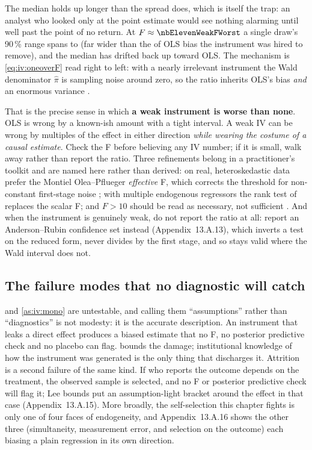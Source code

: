 The median holds up longer than the spread does, which is itself the trap: an analyst who looked
only at the point estimate would see nothing alarming until well past the point of no return. At
$F \approx \nbElevenWeakFWorst$ a single draw's 90\,\% range spans \eur{\nbElevenWeakLo} to
\eur{\nbElevenWeakHi} (far wider than the \eur{\nbElevenNaiveErr} of OLS bias the instrument was
hired to remove), and the median has drifted back up toward OLS. The mechanism is
\cref{eq:iv:oneoverF} read right to left: with a nearly irrelevant instrument the Wald denominator
$\hat\pi$ is sampling noise around zero, so the ratio inherits OLS's bias \emph{and} an enormous
variance \citep{bound1995, staiger1997}.

That is the precise sense in which \textbf{a weak instrument is worse than none}. OLS is wrong by a
known-ish amount with a tight interval. A weak IV can be wrong by multiples of the effect in either
direction \emph{while wearing the costume of a causal estimate}. Check the F before believing any IV
number; if it is small, walk away rather than report the ratio. Three refinements belong in a
practitioner's toolkit and are named here rather than derived: on real, heteroskedastic data prefer
the Montiel Olea--Pflueger \emph{effective} F, which corrects the threshold for non-constant
first-stage noise \citep{olea2013}; with multiple endogenous regressors the rank test of
\citet{kleibergen2006} replaces the scalar F; and $F > 10$ should be read as necessary, not
sufficient \citep{andrews2019}. And when the instrument is genuinely weak, do not report the ratio
at all: report an Anderson--Rubin confidence set instead (Appendix~13.A.13), which inverts a test on
the reduced form, never divides by the first stage, and so stays valid where the Wald interval does
not.

\subsection*{The failure modes that no diagnostic will catch}

 and \cref{as:iv:mono} are untestable, and calling them ``assumptions'' rather than
``diagnostics'' is not modesty: it is the accurate description. An instrument that leaks a direct
effect produces a biased estimate that no F, no posterior predictive check and no placebo can flag.
 bounds the damage; institutional knowledge of how the instrument was
generated is the only thing that discharges it. Attrition is a second failure of the same kind. If
who reports the outcome depends on the treatment, the observed sample is selected, and no F or
posterior predictive check will flag it; Lee bounds put an assumption-light bracket around the effect
in that case (Appendix~13.A.15). More broadly, the self-selection this chapter fights is only one of
four faces of endogeneity, and Appendix~13.A.16 shows the other three (simultaneity, measurement
error, and selection on the outcome) each biasing a plain regression in its own direction.

